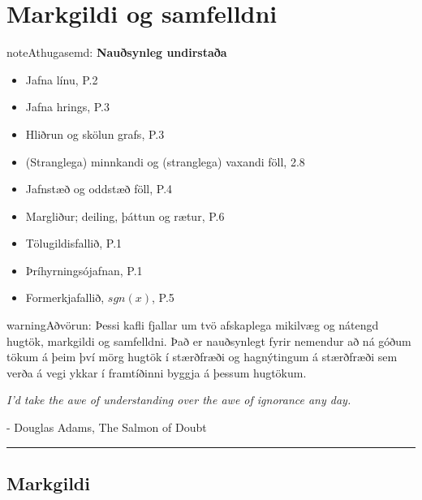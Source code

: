 \documentclass[a4paper,10pt,icelandic]{sphinxmanual}
\begin{document}
\chapter{Markgildi og samfelldni}
\label{kafli02:markgildi-og-samfelldni}\label{kafli02::doc}
\begin{notice}{note}{Athugasemd:}
\textbf{Nauðsynleg undirstaða}
\begin{itemize}
\item {} 
Jafna línu, P.2

\item {} 
Jafna hrings, P.3

\item {} 
Hliðrun og skölun grafs, P.3

\item {} 
(Stranglega) minnkandi og (stranglega) vaxandi föll, 2.8

\item {} 
Jafnstæð og oddstæð föll, P.4

\item {} 
Margliður; deiling, þáttun og rætur, P.6

\item {} 
Tölugildisfallið, P.1

\item {} 
Þríhyrningsójafnan, P.1

\item {} 
Formerkjafallið, \(sgn(x)\), P.5

\end{itemize}
\end{notice}

\begin{notice}{warning}{Aðvörun:}
Þessi kafli fjallar um tvö afskaplega mikilvæg og nátengd hugtök,
markgildi og samfelldni. Það er nauðsynlegt fyrir nemendur að ná
góðum tökum á þeim því mörg hugtök í stærðfræði og hagnýtingum á stærðfræði
sem verða á vegi ykkar í framtíðinni byggja á þessum hugtökum.
\end{notice}

\emph{I'd take the awe of understanding over the awe of ignorance any day.}

- Douglas Adams, The Salmon of Doubt


\bigskip\hrule{}\bigskip



\section{Markgildi}
\label{kafli02:markgildi}\label{kafli02:id1}
\end{document}
